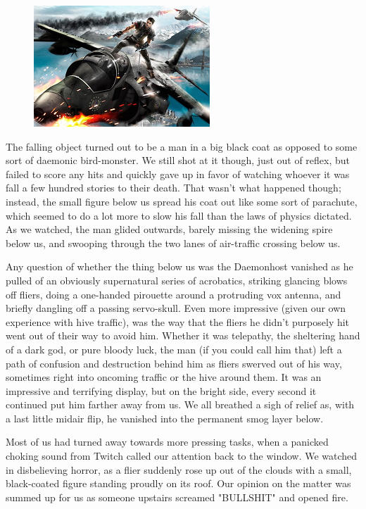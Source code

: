 \begin{figure}
	\begin{center}
		\includegraphics[width=\figwidth]{pics/18/67.png}
	\end{center}
\end{figure}
The falling object turned out to be a man in a big black coat as opposed to some sort of daemonic bird-monster. 
We still shot at it though, just out of reflex, but failed to score any hits and quickly gave up in favor of watching whoever it was fall a few hundred stories to their death. 
That wasn't what happened though; 
instead, the small figure below us spread his coat out like some sort of parachute, which seemed to do a lot more to slow his fall than the laws of physics dictated. 
As we watched, the man glided outwards, barely missing the widening spire below us, and swooping through the two lanes of air-traffic crossing below us.

Any question of whether the thing below us was the Daemonhost vanished as he pulled of an obviously supernatural series of acrobatics, striking glancing blows off fliers, doing a one-handed pirouette around a protruding vox antenna, and briefly dangling off a passing servo-skull. 
Even more impressive (given our own experience with hive traffic), was the way that the fliers he didn't purposely hit went out of their way to avoid him. 
Whether it was telepathy, the sheltering hand of a dark god, or pure bloody luck, the man (if you could call him that) left a path of confusion and destruction behind him as fliers swerved out of his way, sometimes right into oncoming traffic or the hive around them. 
It was an impressive and terrifying display, but on the bright side, every second it continued put him farther away from us. 
We all breathed a sigh of relief as, with a last little midair flip, he vanished into the permanent smog layer below.

Most of us had turned away towards more pressing tasks, when a panicked choking sound from Twitch called our attention back to the window. 
We watched in disbelieving horror, as a flier suddenly rose up out of the clouds with a small, black-coated figure standing proudly on its roof. 
Our opinion on the matter was summed up for us as someone upstairs screamed "BULLSHIT" and opened fire.

